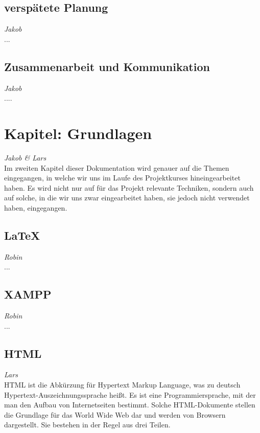 \documentclass[12pt,a4paper,bibliography=totocnumbered,listof=totocnumbered]{scrartcl}
\begin{document}
\subsection{verspätete Planung}
\emph{Jakob}\\
...

\subsection{Zusammenarbeit und Kommunikation}
\emph{Jakob}\\
....

\pagebreak

\section{Kapitel: Grundlagen}
\emph{Jakob \emph{\&} Lars}\\
Im zweiten Kapitel dieser Dokumentation wird genauer auf die Themen eingegangen, in welche wir uns im Laufe des Projektkurses hineingearbeitet haben. Es wird nicht nur auf für das Projekt relevante Techniken, sondern auch auf solche, in die wir uns zwar eingearbeitet haben, sie jedoch nicht verwendet haben, eingegangen.

\subsection{\LaTeX{}}
\label{sec:LaTeX}
\emph{Robin}\\
...

\subsection{XAMPP}
\label{sec:XEMPP}
\emph{Robin}\\
...

\subsection{HTML}
\label{sec:HTML}
\emph{Lars}\\
HTML ist die Abkürzung für \glqq Hypertext Markup Language\grqq, was zu deutsch \glqq Hypertext-Auszeichnungssprache\grqq{} heißt. Es ist eine Programmiersprache, mit der man den Aufbau von Internetseiten bestimmt. Solche HTML-Dokumente stellen die Grundlage für das World Wide Web dar und werden von Browsern dargestellt.\cite{HTML}\cite{Hypertext_Markup_Language} Sie bestehen in der Regel aus drei Teilen.\cite{HTML/Dokumentstruktur_und_Aufbau} 
\end{document}
